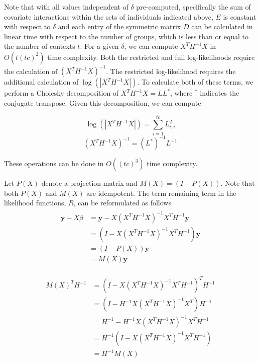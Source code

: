         Note that with all values independent of $\delta$ pre-computed, specifically the sum of covariate interactions within the sets of individuals indicated above, $E$ is constant with respect to $\delta$ and each entry of the symmetric matrix $D$ can be calculated in linear time with respect to the number of groups, which is less than or equal to the number of contexts $t$. For a given $\delta$, we can compute $X^TH^{-1}X$ in $O(t(tc)^2)$ time complexity. Both the restricted and full log-likelihoods require the calculation of $(X^TH^{-1}X)^{-1}$. The restricted log-likelihood requires the additional calculation of $\log{(|X^TH^{-1}X|)}$. To calculate both of these terms, we perform a Cholesky decomposition of $X^TH^{-1}X = LL^*$, where $^*$ indicates the conjugate transpose. Given this decomposition, we can compute 
        
        \begin{equation}
            \log{(|X^TH^{-1}X|)} = \sum_{i=1}^{tc} L_{i,i}^2
        \end{equation}
        \begin{equation}
            (X^TH^{-1}X)^{-1} = (L^*)^{-1}L^{-1}
        \end{equation}
        
        \noindent These operations can be done in $O((tc)^3)$ time complexity. 
        
        Let $P(X)$ denote a projection matrix and $M(X) = (I-P(X))$. Note that both $P(X)$ and $M(X)$ are idempotent. The term remaining term in the likelihood functions, $R$, can be reformulated as follows
        \begin{align}
        \begin{split}
            \mathbf{y}- X\hat{\beta} & = \mathbf{y} - X(X^TH^{-1}X)^{-1}X^TH^{-1}\mathbf{y} \\
                                     & = (I - X(X^TH^{-1}X)^{-1}X^TH^{-1})\mathbf{y} \\
                                     & = (I - P(X))\mathbf{y} \\
                                     & = M(X)\mathbf{y}
        \end{split}
        \end{align}
        
        \begin{align}
        \begin{split}
            M(X)^TH^{-1} & = (I - X(X^TH^{-1}X)^{-1}X^TH^{-1})^T H^{-1} \\
                         & = (I - H^{-1}X(X^TH^{-1}X)^{-1}X^T)H^{-1} \\
                         & = H^{-1} - H^{-1}X(X^TH^{-1}X)^{-1}X^TH^{-1} \\
                         & = H^{-1}(I - X(X^TH^{-1}X)^{-1}X^TH^{-1}) \\
                         & = H^{-1}M(X)
        \end{split}
        \end{align}
    
